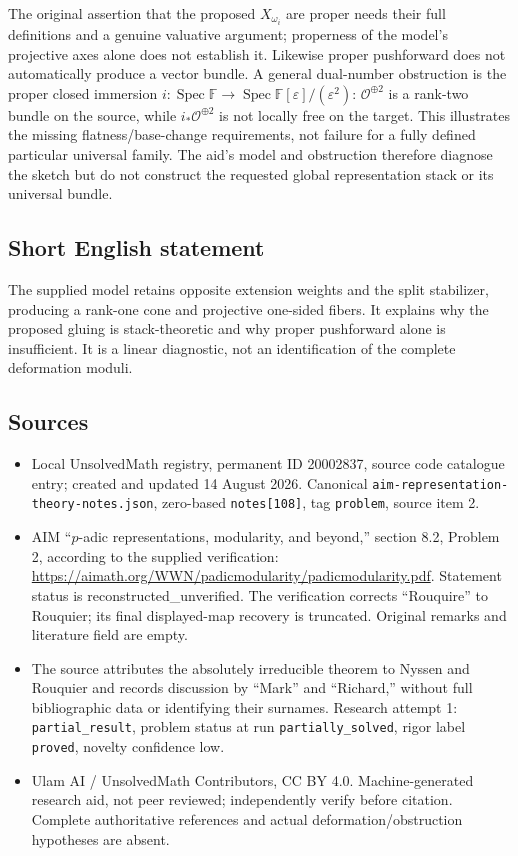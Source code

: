 \documentclass[11pt]{article}
\begin{document}
The original assertion that the proposed $X_{\omega_i}$ are proper needs their full definitions and a genuine valuative argument; properness of the model's projective axes alone does not establish it. Likewise proper pushforward does not automatically produce a vector bundle. A general dual-number obstruction is the proper closed immersion $i:\operatorname{Spec}\mathbb F\to\operatorname{Spec}\mathbb F[\varepsilon]/(\varepsilon^2)$: $\mathcal O^{\oplus2}$ is a rank-two bundle on the source, while $i_*\mathcal O^{\oplus2}$ is not locally free on the target. This illustrates the missing flatness/base-change requirements, not failure for a fully defined particular universal family. The aid's model and obstruction therefore diagnose the sketch but do not construct the requested global representation stack or its universal bundle.
\subsection{Short English statement}
The supplied model retains opposite extension weights and the split stabilizer, producing a rank-one cone and projective one-sided fibers. It explains why the proposed gluing is stack-theoretic and why proper pushforward alone is insufficient. It is a linear diagnostic, not an identification of the complete deformation moduli.
\subsection{Sources}
\begin{itemize}
\item Local UnsolvedMath registry, permanent ID 20002837, source code catalogue entry; created and updated 14 August 2026. Canonical \texttt{aim-representation-theory-notes.json}, zero-based \texttt{notes[108]}, tag \texttt{problem}, source item 2.
\item AIM ``$p$-adic representations, modularity, and beyond,'' section 8.2, Problem 2, according to the supplied verification: \url{https://aimath.org/WWN/padicmodularity/padicmodularity.pdf}. Statement status is reconstructed\_unverified. The verification corrects ``Rouquire'' to Rouquier; its final displayed-map recovery is truncated. Original remarks and literature field are empty.
\item The source attributes the absolutely irreducible theorem to Nyssen and Rouquier and records discussion by ``Mark'' and ``Richard,'' without full bibliographic data or identifying their surnames. Research attempt 1: \texttt{partial\_result}, problem status at run \texttt{partially\_solved}, rigor label \texttt{proved}, novelty confidence low.
\item Ulam AI / UnsolvedMath Contributors, CC BY 4.0. Machine-generated research aid, not peer reviewed; independently verify before citation. Complete authoritative references and actual deformation/obstruction hypotheses are absent.
\end{itemize}
\end{document}
